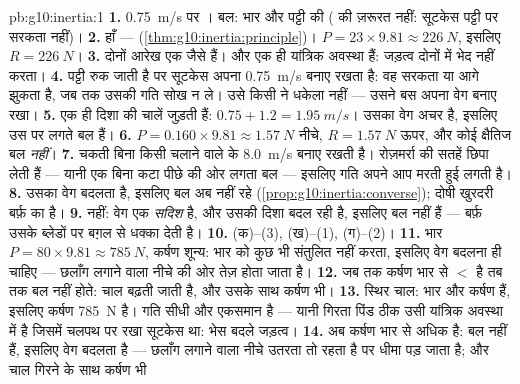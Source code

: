 \begin{solution}{pb:g10:inertia:1}
\textbf{1.} \qty{0.75}{m/s} पर । बल:
भार और पट्टी की  ( की
ज़रूरत नहीं: सूटकेस पट्टी पर सरकता नहीं)।
\textbf{2.} हाँ ---  (\cref{thm:g10:inertia:principle})। $P = 23 \times 9.81 \approx
\qty{226}{N}$,
इसलिए $R = \qty{226}{N}$।
\textbf{3.} दोनों आरेख एक जैसे हैं।  और  एक ही यांत्रिक अवस्था हैं: जड़त्व दोनों में भेद नहीं करता।
\textbf{4.} पट्टी रुक जाती है पर सूटकेस अपना \qty{0.75}{m/s} बनाए रखता है: वह
सरकता या आगे झुकता है, जब तक  उसकी गति सोख न ले। उसे किसी
ने धकेला नहीं --- उसने बस अपना वेग बनाए रखा।
\textbf{5.} एक ही दिशा की चालें जुड़ती हैं: $0.75 + 1.2 =
\qty{1.95}{m/s}$। उसका वेग अचर है,
इसलिए उस पर लगते बल  हैं।
\textbf{6.} $P = 0.160 \times 9.81 \approx \qty{1.57}{N}$ नीचे, $R = \qty{1.57}{N}$ ऊपर, और कोई क्षैतिज बल
\emph{नहीं}।
\textbf{7.} चकती बिना किसी चलाने वाले के \qty{8.0}{m/s} बनाए रखती है।
रोज़मर्रा की सतहें  छिपा लेती हैं --- यानी एक बिना कटा
पीछे की ओर लगता बल --- इसलिए गति अपने आप मरती हुई लगती है।
\textbf{8.} उसका वेग बदलता है, इसलिए बल अब 
नहीं रहे (\cref{prop:g10:inertia:converse}); दोषी खुरदरी बर्फ़ का  है।
\textbf{9.} नहीं: वेग एक \emph{सदिश} है, और उसकी दिशा बदल रही है, इसलिए
बल  नहीं हैं --- बर्फ़ उसके ब्लेडों पर
बग़ल से धक्का देती है।
\textbf{10.} (क)--(3), (ख)--(1), (ग)--(2)।
\textbf{11.} भार $P = 80 \times 9.81 \approx \qty{785}{N}$, कर्षण शून्य: भार को कुछ भी
संतुलित नहीं करता, इसलिए वेग बदलना ही चाहिए --- छलाँग लगाने
वाला नीचे की ओर तेज़ होता जाता है।
\textbf{12.} जब तक कर्षण भार से $<$ है तब तक बल
 नहीं होते: चाल बढ़ती जाती है, और उसके साथ कर्षण भी।
\textbf{13.} स्थिर चाल: भार और कर्षण  हैं,
इसलिए कर्षण \qty{785}{N} है। गति सीधी और एकसमान है --- यानी गिरता पिंड ठीक
उसी यांत्रिक अवस्था में है जिसमें चलपथ पर रखा सूटकेस था: भेस बदले
जड़त्व।
\textbf{14.} अब कर्षण भार से अधिक है: बल
 नहीं हैं, इसलिए वेग बदलता है --- छलाँग लगाने वाला
नीचे उतरता तो रहता है पर धीमा पड़ जाता है; और चाल गिरने के साथ कर्षण भी

\end{solution}
